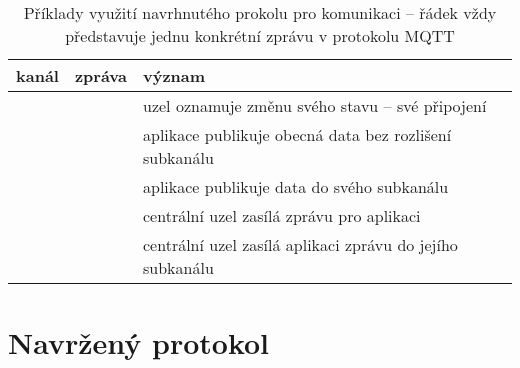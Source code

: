 \begin{table}
    \centering

    \caption{Příklady využití navrhnutého prokolu pro komunikaci -- řádek vždy představuje jednu konkrétní zprávu v
    protokolu MQTT}
    \begin{tabularx}{\textwidth}{s|l|s}
        \textbf{kanál} & \textbf{zpráva} & \textbf{význam} \\
        \hline
         &  & uzel  oznamuje změnu svého stavu -- své
        připojení \\

         &  & aplikace publikuje obecná data bez rozlišení
        subkanálu\\

         &  & aplikace publikuje data do svého
        subkanálu  \\

         &  & centrální uzel zasílá zprávu pro aplikaci
         \\

         &  & centrální uzel zasílá aplikaci
         zprávu do jejího subkanálu  \\


    \end{tabularx}
    \label{table:mqtt-subscribes}
\end{table}




\section{Navržený protokol}


